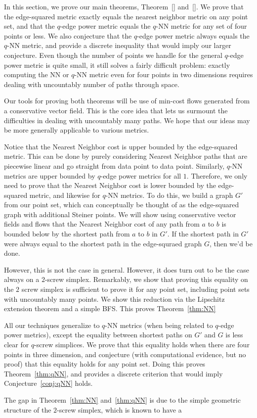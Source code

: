In this section, we prove our main theorems, Theorem~\ref{} and~\ref{}.
We prove that the edge-squared metric exactly equals the nearest neighbor
metric on any point set, and that the $q$-edge power metric equals the $q$-NN
metric for any set of four points or less. We also conjecture that the $q$-edge
power metric always equals the $q$-NN metric, and provide a discrete
inequality that would imply our larger conjecture. Even though the number of points
we handle for the general $q$-edge power metric is quite small, it still
solves a fairly difficult problem:
exactly computing the NN or $q$-NN metric even for four
points in two dimensions requires dealing with uncountably number of paths
through space.

Our tools for proving both theorems will be use of min-cost flows generated
from a conservative vector field. This is the core idea that lets us surmount
the difficulties in dealing with uncountably many paths. We hope that our ideas
may be more generally applicable to various metrics.  

Notice that the Nearest Neighbor cost is upper bounded by the edge-squared
metric. This can be done by purely considering Nearest Neighbor paths that
are piecewise linear and go straight from data point to data point.
Similarly, $q$-NN metrics are upper bounded by $q$-edge power metrics for
all $1$.
Therefore, we only need to prove that the Nearest Neighbor cost is lower
bounded by the edge-squared metric, and likewise for $q$-NN metrics.
To do this, we build a graph $G'$ from our point set, which can
conceptually be thought of as the edge-squared graph with additional
Steiner points. We will show using conservative vector fields and flows
that the Nearest Neighbor cost of any path from $a$ to $b$ is bounded below
by the shortest path from $a$ to $b$ in $G'$. If the shortest path in $G'$
were always equal to the shortest path in the edge-squraed graph $G$, then
we'd be done.

However, this is not the case in general. However, it does turn out to be
the case always on a $2$-screw simplex. Remarkably, we show that proving
this equality on the $2$ screw simplex is sufficient to prove it for any
point set, including point sets with uncountably many points. We show this
reduction via the Lipschitz extension theorem and a simple
BFS. This proves Theorem~\ref{thm:NN}

All our techniques generalize to $q$-NN metrics (when being related to $q$-edge power
metrics), except the equality
between shortest paths on $G'$ and $G$ is less clear for $q$-screw
simplices. We prove that this equality holds when there are four points in
three dimension, and conjecture (with computational evidence, but no proof) that this
equality holds for any point set. Doing this proves
Theorem~\ref{thm:qNN}, and provides a discrete criterion that would imply
Conjecture~\ref{conj:qNN} holds.

The gap in Theorem~\ref{thm:NN} and~\ref{thm:qNN} is due to the simple
geometric structure of the $2$-screw simplex, which is known to have a
